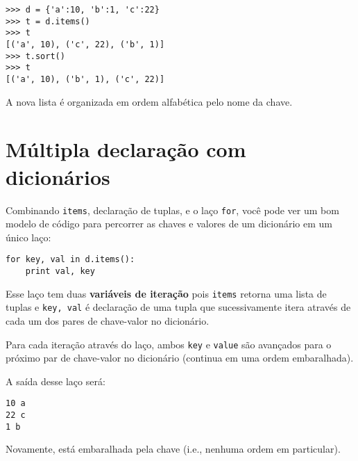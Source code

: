 \beforeverb
\begin{verbatim}
>>> d = {'a':10, 'b':1, 'c':22}
>>> t = d.items()
>>> t
[('a', 10), ('c', 22), ('b', 1)]
>>> t.sort()
>>> t
[('a', 10), ('b', 1), ('c', 22)]
\end{verbatim}
\afterverb
%
A nova lista é organizada em ordem alfabética pelo nome da chave.

\section{Múltipla declaração com dicionários}


Combinando {\tt items}, declaração de tuplas, e o laço {\tt for}, você pode
ver um bom modelo de código para percorrer as chaves e valores de um
dicionário em um único laço:

\beforeverb
\begin{verbatim}
for key, val in d.items():
    print val, key
\end{verbatim}
\afterverb
%
Esse laço tem duas {\bf variáveis de iteração} pois {\tt items} retorna uma
lista de tuplas e {\tt key, val} é declaração de uma tupla que sucessivamente
itera através de cada um dos pares de chave-valor no dicionário.

Para cada iteração através do laço, ambos {\tt key} e {\tt value} são
avançados para o próximo par de chave-valor no dicionário (continua em uma
ordem embaralhada).

A saída desse laço será:

\beforeverb
\begin{verbatim}
10 a
22 c
1 b
\end{verbatim}
\afterverb
%
Novamente, está embaralhada pela chave (i.e., nenhuma ordem em particular).

